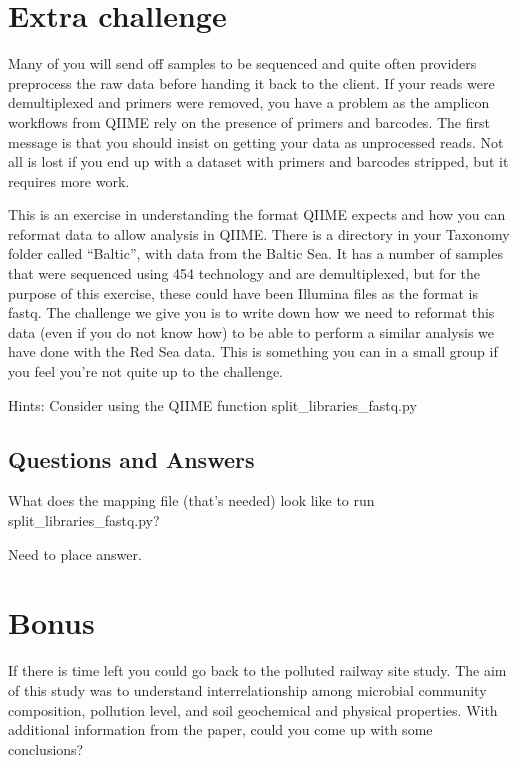 \section{Extra challenge}

Many of you will send off samples to be sequenced and quite often providers preprocess the raw data before handing it back to the client. If your reads were demultiplexed and primers were removed, you have a problem as the amplicon workflows from QIIME rely on the presence of primers and barcodes. The first message is that you should insist on getting your data as unprocessed reads. Not all is lost if you end up with a dataset with primers and barcodes stripped, but it requires more work.

This is an exercise in understanding the format QIIME expects and how you can reformat data to allow analysis in QIIME.
There is a directory in your Taxonomy folder called “Baltic”, with data from the Baltic Sea. It has a number of samples that were sequenced using 454 technology and are demultiplexed, but for the purpose of this exercise, these could have been Illumina files as the format is fastq. 
The challenge we give you is to write down how we need to reformat this data (even if you do not know how) to be able to perform a similar analysis we have done with the Red Sea data. This is something you can in a small group if you feel you’re not quite up to the challenge. 

Hints:
Consider using the QIIME function split_libraries_fastq.py

\subsection{Questions and Answers}
\begin{questions}
What does the mapping file (that’s needed) look like to run split_libraries_fastq.py? 
\begin{answer}
Need to place answer.
\end{answer}

\end{questions}

\section{Bonus}

If there is time left you could go back to the polluted railway site study. The aim of this study was to understand interrelationship among microbial community composition, pollution level, and soil geochemical and physical properties. With additional information from the paper, could you come up with some conclusions?


